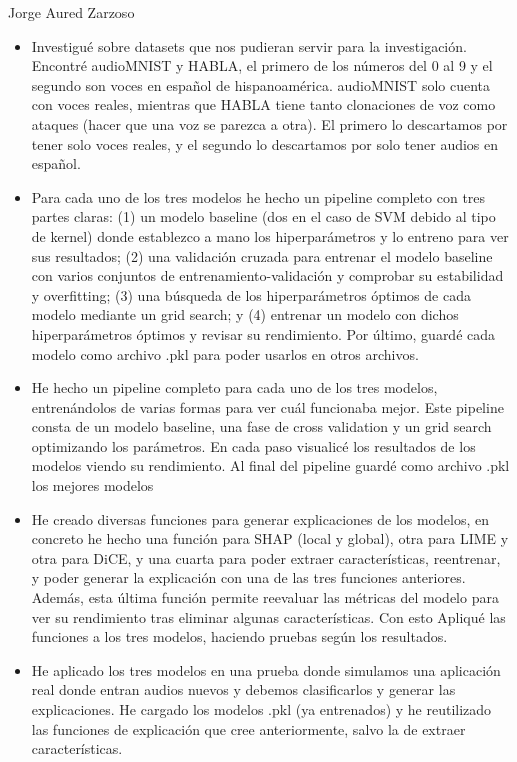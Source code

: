 \begin{contribucion}{Jorge Aured Zarzoso}
\begin{itemize}
	 \item Investigué sobre datasets que nos pudieran servir para la investigación. Encontré audioMNIST y HABLA, el primero de los números del 0 al 9 y el segundo son voces en español de hispanoamérica. audioMNIST solo cuenta con voces reales, mientras que HABLA tiene tanto clonaciones de voz como ataques (hacer que una voz se parezca a otra). El primero lo descartamos por tener solo voces reales, y el segundo lo descartamos por solo tener audios en español.
	 
	 \item Para cada uno de los tres modelos he hecho un pipeline completo con tres partes claras: (1) un modelo baseline (dos en el caso de SVM debido al tipo de kernel) donde establezco a mano los hiperparámetros y lo entreno para ver sus resultados; (2) una validación cruzada para entrenar el modelo baseline con varios conjuntos de entrenamiento-validación y comprobar su estabilidad y overfitting; (3) una búsqueda de los hiperparámetros óptimos de cada modelo mediante un grid search; y (4) entrenar un modelo con dichos hiperparámetros óptimos y revisar su rendimiento. Por último, guardé cada modelo como archivo .pkl para poder usarlos en otros archivos.
	 
	 \item He hecho un pipeline completo para cada uno de los tres modelos, entrenándolos de varias formas para ver cuál funcionaba mejor. Este pipeline consta de un modelo baseline, una fase de cross validation y un grid search optimizando los parámetros. En cada paso visualicé los resultados de los modelos viendo su rendimiento. Al final del pipeline guardé como archivo .pkl los mejores modelos
	 
	\item He creado diversas funciones para generar explicaciones de los modelos, en concreto he hecho una función para SHAP (local y global), otra para LIME y otra para DiCE, y una cuarta para poder extraer características, reentrenar, y poder generar la explicación con una de las tres funciones anteriores. Además, esta última función permite reevaluar las métricas del modelo para ver su rendimiento tras eliminar algunas características. Con esto Apliqué las funciones a los tres modelos, haciendo pruebas según los resultados. 
	
	\item He aplicado los tres modelos en una prueba donde simulamos una aplicación real donde entran audios nuevos y debemos clasificarlos y generar las explicaciones. He cargado los modelos .pkl (ya entrenados) y he reutilizado las funciones de explicación que cree anteriormente, salvo la de extraer características.
	

\end{itemize}
\end{contribucion}
